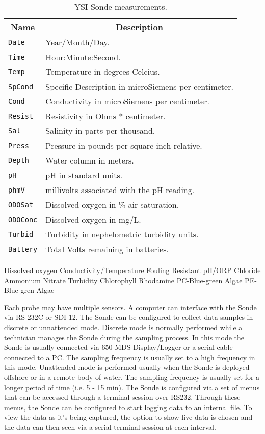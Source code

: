 \documentclass[conference]{IEEEtran}
\begin{document}
\begin{table}[h]
\caption{\label{TAB_SONDE_MEASUREMENTS} YSI Sonde measurements.}
\centering
\begin{tabular}{|l||l|}
\hline
\multicolumn{1}{|c||}{\textbf{Name}} &
\multicolumn{1}{c|}{\textbf{Description}} \\ \hline \hline
\texttt{Date}    & Year/Month/Day. \\ \hline
\texttt{Time}    & Hour:Minute:Second. \\ \hline
\texttt{Temp}    & Temperature in degrees Celcius. \\ \hline
\texttt{SpCond}  & Specific Description in microSiemens
                   per centimeter. \\ \hline
\texttt{Cond}    & Conductivity in microSiemens per centimeter. \\ \hline
\texttt{Resist}  & Resistivity in Ohms $*$ centimeter. \\ \hline
\texttt{Sal}     & Salinity in parts per thousand. \\ \hline
\texttt{Press}   & Pressure in pounds per square inch relative. \\ \hline
\texttt{Depth}   & Water column in meters. \\ \hline
\texttt{pH}      & pH in standard units. \\ \hline
\texttt{phmV}    & millivolts associated with the pH reading. \\ \hline
\texttt{ODOSat}  & Dissolved oxygen in \% air saturation. \\ \hline
\texttt{ODOConc} & Dissolved oxygen in mg/L. \\ \hline
\texttt{Turbid}  & Turbidity in nephelometric turbidity units. \\ \hline
\texttt{Battery} & Total Volts remaining in batteries.  \\ \hline
\end{tabular}
\end{table}

Dissolved oxygen
Conductivity/Temperature
Fouling Resistant pH/ORP
Chloride
Ammonium
Nitrate
Turbidity
Chlorophyll
Rhodamine
PC-Blue-green Algae
PE-Blue-gren Algae

Each probe may have multiple sensors.  A computer can interface with
the Sonde via RS-232C or SDI-12. The Sonde can be configured to
collect data samples in discrete or unnattended mode.  Discrete mode
is normally performed while a technician manages the Sonde during the
sampling process. In this mode the Sonde is usually connected via 650
MDS Display/Logger or a serial cable connected to a PC.  The sampling
frequency is usually set to a high frequency in this mode.  Unattended
mode is performed usually when the Sonde is deployed offshore or in a
remote body of water.  The sampling frequency is usually set for a
longer period of time (i.e. 5 - 15 min). The Sonde is configured via a
set of menus that can be accessed through a terminal session over
RS232. Through these menus, the Sonde can be configured to start
logging data to an internal file.  To view the data as it's being
captured, the option to show live data is chosen and the data can then
seen via a serial terminal session at each interval.
\end{document}
